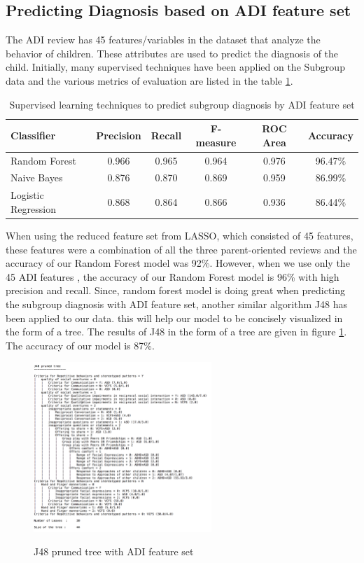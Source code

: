 \subsection{Predicting Diagnosis based on ADI feature set}
The ADI review has 45 features/variables in the dataset that analyze the behavior of children. These attributes are used to predict the diagnosis of the child. Initially, many supervised techniques have been applied on the Subgroup data and the various metrics of evaluation are listed in the table \ref{table:45}. 
\begin{table}[h]
\begin{center}
\begin{tabular}{|l|c|c|c|c|c|}
\hline 
\textbf{Classifier} &	\textbf{Precision} &	\textbf{Recall} &	\textbf{F-measure} & \textbf{ROC Area}&	\textbf{Accuracy}\\
\hline \hline
Random Forest	&0.966&	0.965&	0.964&	0.976&	96.47\%\\
\hline
Naive Bayes&0.876	&0.870&	0.869&	0.959&	86.99\%\\
\hline
Logistic Regression&0.868&	0.864	&0.866&	0.936&	86.44\%\\
\hline
\end{tabular}
\end{center}
\caption{Supervised learning techniques to predict subgroup diagnosis by ADI feature set}
\label{table:45}
\end{table}

When using the reduced feature set from LASSO, which consisted of 45 features, these features were a combination of all the three parent-oriented reviews and the accuracy of our Random Forest model was 92\%. However, when we use only the 45 ADI features , the accuracy of our Random Forest model is 96\% with high precision and recall. Since, random forest model is doing great when predicting the subgroup diagnosis with ADI feature set, another similar algorithm J48 has been applied to our data. this will help our model to be concisely visualized in the form of a tree. The results of J48 in the form of a tree are given in figure \ref{fig:44}. The accuracy of our model is 87\%.

\begin{figure}
\centering
  {\includegraphics[width=0.6\textwidth]{Figures/Figure_4_4.png}}
  \caption{J48 pruned tree with ADI feature set}
  \label{fig:44}
\end{figure}

